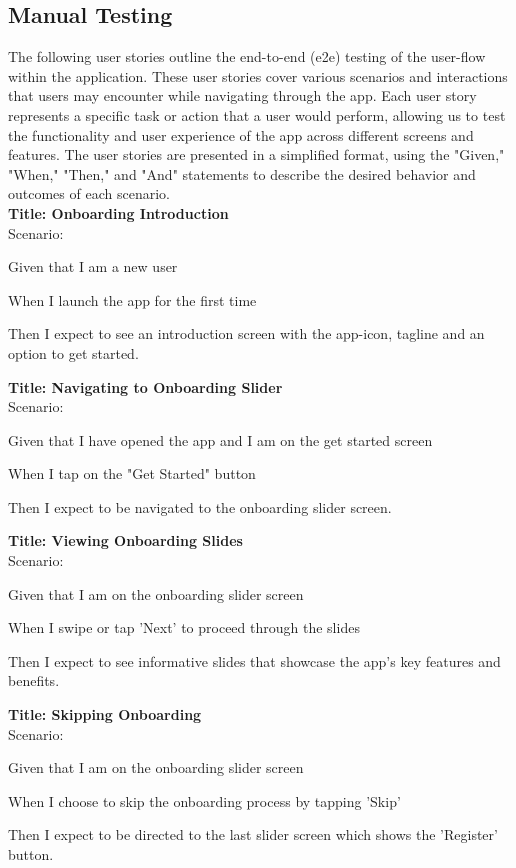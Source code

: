 \subsection{Manual Testing}
The following user stories outline the end-to-end (e2e) testing of the user-flow within the application. These user stories cover various scenarios and interactions that users may encounter while navigating through the app. Each user story represents a specific task or action that a user would perform, allowing us to test the functionality and user experience of the app across different screens and features.
The user stories are presented in a simplified format, using the "Given," "When," "Then," and "And" statements to describe the desired behavior and outcomes of each scenario. 
\\
\textbf{Title: Onboarding Introduction} \\
Scenario:
\begin{compactitem}
    \item Given that I am a new user
    \item When I launch the app for the first time
    \item Then I expect to see an introduction screen with the app-icon, tagline and an option to get started.
\end{compactitem}

\bigskip
\textbf{Title: Navigating to Onboarding Slider} \\
Scenario:
\begin{compactitem}
    \item Given that I have opened the app and I am on the get started screen
    \item When I tap on the "Get Started" button
    \item Then I expect to be navigated to the onboarding slider screen.
\end{compactitem}

\bigskip
\textbf{Title: Viewing Onboarding Slides} \\
Scenario:
\begin{compactitem}
    \item Given that I am on the onboarding slider screen
    \item When I swipe or tap 'Next' to proceed through the slides
    \item Then I expect to see informative slides that showcase the app's key features and benefits.
\end{compactitem}

\bigskip
\textbf{Title: Skipping Onboarding} \\
Scenario:
\begin{compactitem}
    \item Given that I am on the onboarding slider screen
    \item When I choose to skip the onboarding process by tapping 'Skip'
    \item Then I expect to be directed to the last slider screen which shows the 'Register' button.
\end{compactitem}

